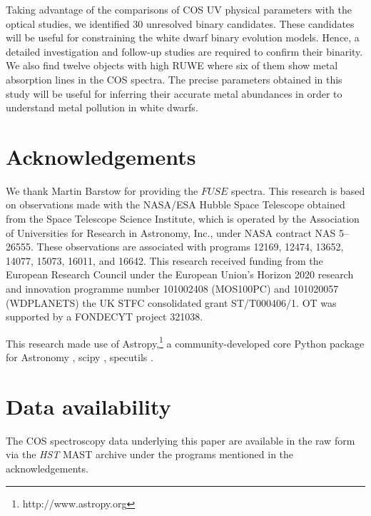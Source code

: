 \documentclass[fleqn,usenatbib, useAMS]{mnras}
\begin{document}
Taking advantage of the comparisons of COS UV physical parameters with the optical studies, we identified 30 unresolved binary candidates. These candidates will be useful for constraining the white dwarf binary evolution models.  Hence, a detailed investigation and follow-up studies are required to confirm their binarity. We also find twelve objects with high RUWE where six of them show metal absorption lines in the COS spectra. The precise parameters obtained in this study will be useful for inferring their accurate metal abundances in order to understand metal pollution in white dwarfs.

\section*{Acknowledgements}
We thank Martin Barstow for providing the $FUSE$ spectra. This research is based on observations made with the NASA/ESA Hubble Space Telescope obtained from the Space Telescope Science Institute, which is operated by the Association of Universities for Research in Astronomy, Inc., under NASA contract NAS 5–26555. These observations are associated with programs 12169, 12474, 13652, 14077, 15073, 16011, and 16642. This research received funding from the European Research Council under the European Union’s Horizon 2020 research and innovation programme number 101002408 (MOS100PC) and 101020057 (WDPLANETS) the UK STFC consolidated grant ST/T000406/1. OT was supported by a FONDECYT project 321038.

This research made use of Astropy,\footnote{http://www.astropy.org} a community-developed core Python package for Astronomy \citep{astropy:2013, astropy:2018}, scipy \citep{2020SciPy-NMeth}, specutils \citep{nicholas_earl_2023_7803739}.

\section{Data availability}
The COS spectroscopy data underlying this paper are available in the raw form via the \textit{HST} MAST archive under the programs mentioned in the acknowledgements. 




\newpage
\appendix
\end{document}
